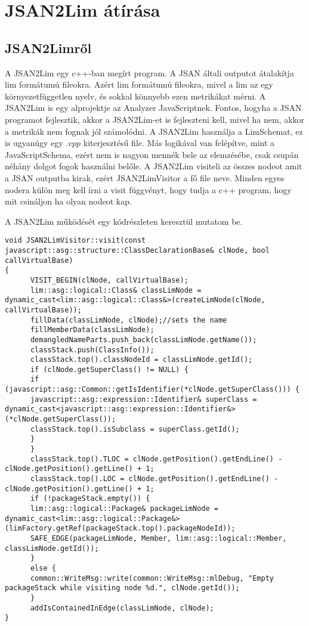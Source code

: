 \chapter{JSAN2Lim átírása}\label{chap:JSAN2Lim átírása}

\section{JSAN2Limről}

\noindent

A JSAN2Lim egy c++-ban megírt program. A JSAN általi outputot átalakítja lim formátumú fileokra.
Azért lim formátumú fileokra, mivel a lim az egy környezetfüggetlen nyelv, és sokkal könnyebb ezen metrikákat mérni.
A JSAN2Lim is egy alprojektje az Analyzer JavaScriptnek.
Fontos, hogyha a JSAN programot fejlesztik, akkor a JSAN2Lim-et is fejleszteni kell, mivel ha nem, akkor a metrikák nem fognak jól számolódni.
A JSAN2Lim használja a LimSchemat, ez is ugyanúgy egy $.vpp$ kiterjesztésű file.
Más logikával van felépítve, mint a JavaScriptSchema, ezért nem is nagyon mennék bele az elemzésébe, csak csupán néhány dolgot fogok használni belőle.
A JSAN2Lim visiteli az összes nodeot amit a JSAN outputba kirak, ezért JSAN2LimVisitor a fő file neve.
Minden egyes nodera külön meg kell írni a visit függvényt, hogy tudja a c++ program, hogy mit csináljon ha olyan nodeot kap.

\noindent

A JSAN2Lim működését egy kódrészleten keresztül mutatom be.
\begin{lstlisting}[caption={ClassDeclaration Visitor}, label={lst:classdeclaration_visitor}, language={CStyle}]
void JSAN2LimVisitor::visit(const javascript::asg::structure::ClassDeclarationBase& clNode, bool callVirtualBase)
{
      VISIT_BEGIN(clNode, callVirtualBase);
      lim::asg::logical::Class& classLimNode = dynamic_cast<lim::asg::logical::Class&>(createLimNode(clNode, callVirtualBase));
      fillData(classLimNode, clNode);//sets the name
      fillMemberData(classLimNode);
      demangledNameParts.push_back(classLimNode.getName());
      classStack.push(ClassInfo());
      classStack.top().classNodeId = classLimNode.getId();
      if (clNode.getSuperClass() != NULL) {
      if (javascript::asg::Common::getIsIdentifier(*clNode.getSuperClass())) {
      javascript::asg::expression::Identifier& superClass = dynamic_cast<javascript::asg::expression::Identifier&>(*clNode.getSuperClass());
      classStack.top().isSubclass = superClass.getId();
      }
      }
      classStack.top().TLOC = clNode.getPosition().getEndLine() - clNode.getPosition().getLine() + 1;
      classStack.top().LOC = clNode.getPosition().getEndLine() - clNode.getPosition().getLine() + 1;
      if (!packageStack.empty()) {
      lim::asg::logical::Package& packageLimNode = dynamic_cast<lim::asg::logical::Package&>(limFactory.getRef(packageStack.top().packageNodeId));
      SAFE_EDGE(packageLimNode, Member, lim::asg::logical::Member, classLimNode.getId());
      }
      else {
      common::WriteMsg::write(common::WriteMsg::mlDebug, "Empty packageStack while visiting node %d.", clNode.getId());
      }
      addIsContainedInEdge(classLimNode, clNode);
}
\end{lstlisting}

